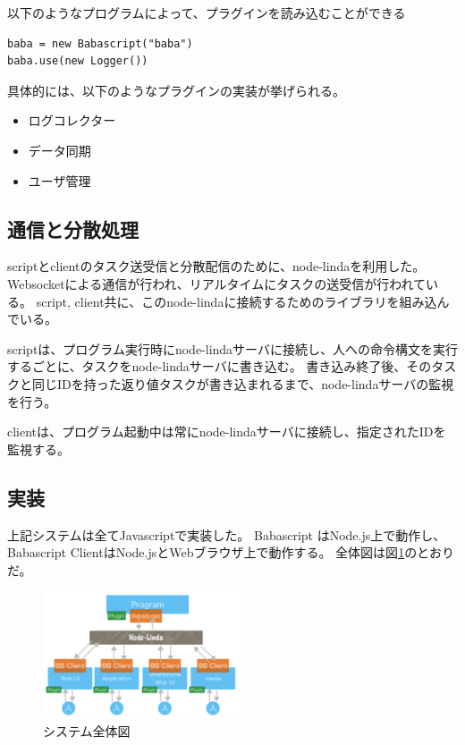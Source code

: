 以下のようなプログラムによって、プラグインを読み込むことができる

\begin{verbatim}
baba = new Babascript("baba")
baba.use(new Logger())
\end{verbatim}

具体的には、以下のようなプラグインの実装が挙げられる。

\begin{itemize}
\itemsep1pt\parskip0pt
\item
  ログコレクター
\item
  データ同期
\item
  ユーザ管理
\end{itemize}

\subsection{通信と分散処理}\label{ux901aux4fe1ux3068ux5206ux6563ux51e6ux7406}

scriptとclientのタスク送受信と分散配信のために、node-linda\cite{linda}を利用した。
Websocketによる通信が行われ、リアルタイムにタスクの送受信が行われている。
script,
client共に、このnode-lindaに接続するためのライブラリを組み込んでいる。

scriptは、プログラム実行時にnode-lindaサーバに接続し、人への命令構文を実行するごとに、タスクをnode-lindaサーバに書き込む。
書き込み終了後、そのタスクと同じIDを持った返り値タスクが書き込まれるまで、node-lindaサーバの監視を行う。

clientは、プログラム起動中は常にnode-lindaサーバに接続し、指定されたIDを監視する。

\subsection{実装}\label{ux5b9fux88c5}

上記システムは全てJavascriptで実装した。 Babascript
はNode.js上で動作し、 Babascript
ClientはNode.jsとWebブラウザ上で動作する。
全体図は図\ref{system}のとおりだ。

\begin{figure}[h]
  \includegraphics[width=220px]{./images/system.png}
  \caption{システム全体図}  
  \label{system}
\end{figure}

